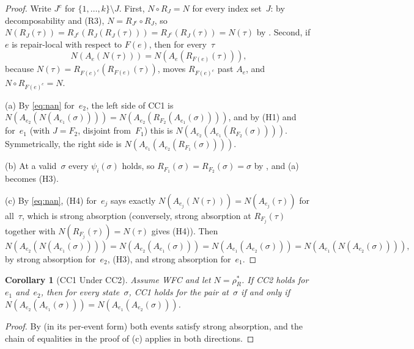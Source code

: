 \documentclass[11pt,a4paper]{article}
\theoremstyle{plain}
\newtheorem{corollary}[theorem]{Corollary}
\theoremstyle{definition}
\theoremstyle{remark}
\begin{document}
\begin{proof}
Write $J^c$ for $\{1, \ldots, k\} \setminus J$.  First, $N \circ R_J = N$ for
every index set~$J$: by decomposability and (R3), $N = R_{J^c} \circ R_J$, so
$N(R_J(\tau)) = R_{J^c}(R_J(R_J(\tau))) = R_{J^c}(R_J(\tau)) = N(\tau)$ by
.  Second, if $e$ is repair-local with respect to
$F(e)$, then for every~$\tau$
\begin{equation}
\label{eq:nan}
N(A_e(N(\tau))) = N(A_e(R_{F(e)}(\tau))),
\end{equation}
because $N(\tau) = R_{F(e)^c}(R_{F(e)}(\tau))$, 
moves $R_{F(e)^c}$ past $A_e$, and $N \circ R_{F(e)^c} = N$.

(a) By \eqref{eq:nan} for~$e_2$, the left side of CC1 is
$N(A_{e_2}(N(A_{e_1}(\sigma)))) = N(A_{e_2}(R_{F_2}(A_{e_1}(\sigma))))$, and
by (H1) and  for~$e_1$ (with $J = F_2$, disjoint
from~$F_1$) this is $N(A_{e_2}(A_{e_1}(R_{F_2}(\sigma))))$.  Symmetrically,
the right side is $N(A_{e_1}(A_{e_2}(R_{F_1}(\sigma))))$.

(b) At a valid~$\sigma$ every $\psi_i(\sigma)$ holds, so
$R_{F_1}(\sigma) = R_{F_2}(\sigma) = \sigma$ by
, and (a) becomes (H3).

(c) By \eqref{eq:nan}, (H4) for~$e_j$ says exactly
$N(A_{e_j}(N(\tau))) = N(A_{e_j}(\tau))$ for all~$\tau$, which is strong
absorption (conversely, strong absorption at $R_{F_j}(\tau)$ together with
$N(R_{F_j}(\tau)) = N(\tau)$ gives (H4)).  Then
\[
N(A_{e_2}(N(A_{e_1}(\sigma)))) = N(A_{e_2}(A_{e_1}(\sigma)))
= N(A_{e_1}(A_{e_2}(\sigma))) = N(A_{e_1}(N(A_{e_2}(\sigma)))),
\]
by strong absorption for~$e_2$, (H3), and strong absorption for~$e_1$.
\end{proof}

\begin{corollary}[CC1 Under CC2]
\label{cor:cc1-under-cc2}
Assume WFC and let $N = \rho_R^*$.  If CC2 holds for $e_1$ and~$e_2$, then
for every state~$\sigma$, CC1 holds for the pair at~$\sigma$ if and only if
$N(A_{e_2}(A_{e_1}(\sigma))) = N(A_{e_1}(A_{e_2}(\sigma)))$.
\end{corollary}

\begin{proof}
By  (in its per-event form) both events satisfy
strong absorption, and the chain of equalities in the proof of
(c) applies in both directions.
\end{proof}
\end{document}
